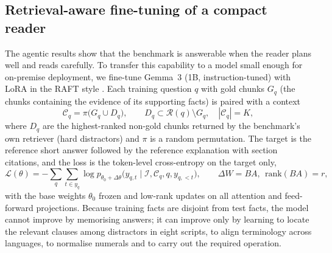 \documentclass[preprint,12pt]{elsarticle}
\begin{document}
\subsection{Retrieval-aware fine-tuning of a compact reader}
\label{sec:ft}
The agentic results show that the benchmark is answerable when the reader plans well and reads carefully. To transfer this capability to a model small enough for on-premise deployment, we fine-tune Gemma~3 (1B, instruction-tuned) \cite{gemma3} with LoRA \cite{hu2022lora} in the RAFT style \cite{zhang2024raft}. Each training question $q$ with gold chunks $G_q$ (the chunks containing the evidence of its supporting facts) is paired with a context
\begin{equation}
\mathcal{C}_q = \pi\big(G_q \cup D_q\big),\qquad D_q\subset \mathcal{R}(q)\setminus G_q,\quad |\mathcal{C}_q|=K,
\end{equation}
where $D_q$ are the highest-ranked non-gold chunks returned by the benchmark's own retriever (hard distractors) and $\pi$ is a random permutation. The target is the reference short answer followed by the reference explanation with section citations, and the loss is the token-level cross-entropy on the target only,
\begin{equation}
\mathcal{L}(\theta)=-\sum_{q}\sum_{t\in y_q}\log p_{\theta_0+\Delta\theta}\big(y_{q,t}\mid \mathcal{I},\mathcal{C}_q,q,y_{q,<t}\big),\qquad \Delta W=BA,\ \ \mathrm{rank}(BA)=r,
\end{equation}
with the base weights $\theta_0$ frozen and low-rank updates on all attention and feed-forward projections. Because training facts are disjoint from test facts, the model cannot improve by memorising answers; it can improve only by learning to locate the relevant clauses among distractors in eight scripts, to align terminology across languages, to normalise numerals and to carry out the required operation.
\end{document}
